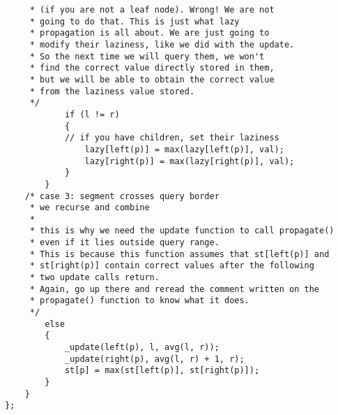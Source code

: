 \documentclass[12pt]{book}
\begin{document}
\begin{verbatim}
	 * (if you are not a leaf node). Wrong! We are not
	 * going to do that. This is just what lazy
	 * propagation is all about. We are just going to
	 * modify their laziness, like we did with the update.
	 * So the next time we will query them, we won't
	 * find the correct value directly stored in them,
	 * but we will be able to obtain the correct value
	 * from the laziness value stored.
	 */
			if (l != r)
			{
			// if you have children, set their laziness
				lazy[left(p)] = max(lazy[left(p)], val);
				lazy[right(p)] = max(lazy[right(p)], val);
			}
		}
	/* case 3: segment crosses query border
	 * we recurse and combine
	 *
	 * this is why we need the update function to call propagate()
	 * even if it lies outside query range.
	 * This is because this function assumes that st[left(p)] and
	 * st[right(p)] contain correct values after the following
	 * two update calls return.
	 * Again, go up there and reread the comment written on the
	 * propagate() function to know what it does.
	 */
		else
		{
			_update(left(p), l, avg(l, r));
			_update(right(p), avg(l, r) + 1, r);
			st[p] = max(st[left(p)], st[right(p)]);
		}
	}
};
\end{verbatim}
\end{document}
